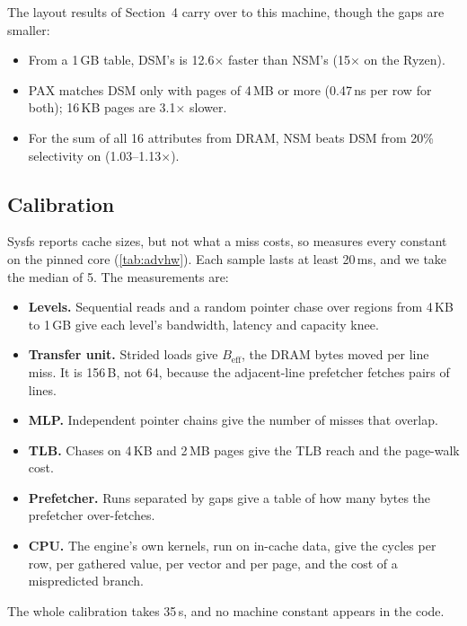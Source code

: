 The layout results of Section~4 carry over to this machine, though the gaps are smaller:
\begin{itemize}
  \item From a 1\,GB table, DSM's  is 12.6$\times$ faster than NSM's (15$\times$
  on the Ryzen).
  \item PAX matches DSM only with pages of 4\,MB or more (0.47\,ns per row for both); 16\,KB
  pages are 3.1$\times$ slower.
  \item For the sum of all 16 attributes from DRAM, NSM beats DSM from 20\% selectivity on
  (1.03--1.13$\times$).
\end{itemize}

\begin{table}[t]
\caption{The second machine as calibrated by  (one P-core; bandwidth
of a sequential read, latency of a random pointer chase).}
\label{tab:advhw}
\small{}
\end{table}

\subsection{Calibration}
Sysfs reports cache sizes, but not what a miss costs, so  measures every
constant on the pinned core (\cref{tab:advhw}). Each sample lasts at least 20\,ms, and we take
the median of 5. The measurements are:
\begin{itemize}
  \item \textbf{Levels.} Sequential reads and a random pointer chase over regions from 4\,KB
  to 1\,GB give each level's bandwidth, latency and capacity knee.
  \item \textbf{Transfer unit.} Strided loads give $B_\mathrm{eff}$, the DRAM bytes moved per
  line miss. It is 156\,B, not 64, because the adjacent-line prefetcher fetches pairs of
  lines.
  \item \textbf{MLP.} Independent pointer chains give the number of misses that overlap.
  \item \textbf{TLB.} Chases on 4\,KB and 2\,MB pages give the TLB reach and the page-walk
  cost.
  \item \textbf{Prefetcher.} Runs separated by gaps give a table of how many bytes the
  prefetcher over-fetches.
  \item \textbf{CPU.} The engine's own kernels, run on in-cache data, give the cycles per row,
  per gathered value, per vector and per page, and the cost of a mispredicted branch.
\end{itemize}
The whole calibration takes 35\,s, and no machine constant appears in the code.

